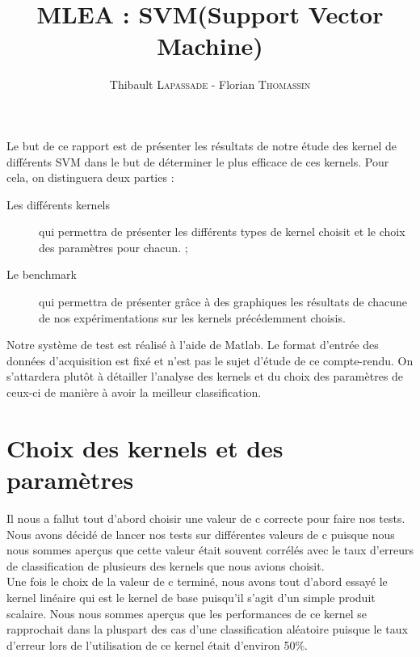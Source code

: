 \documentclass[fontsize=10pt, twoside=no]{scrartcl} %
\begin{document}
\title{MLEA : SVM(Support Vector Machine)}
\author{Thibault \textsc{Lapassade} - Florian \textsc{Thomassin}}
\date{}
\maketitle
\vspace*{-3cm}

\part{}

Le but de ce rapport est de présenter les résultats de notre étude des kernel de différents SVM dans le but de déterminer le plus efficace de ces kernels. Pour cela, on distinguera deux parties :

\begin{description}
\item[Les différents kernels] qui permettra de présenter les différents types de kernel choisit et le choix des paramètres pour chacun. ;
\item[Le benchmark] qui permettra de présenter grâce à des graphiques les résultats de chacune de nos expérimentations sur les kernels précédemment choisis.
\end{description}

Notre système de test est réalisé à l'aide de Matlab. Le format d'entrée des données d'acquisition est fixé et n'est pas le sujet d'étude de ce compte-rendu. On s'attardera plutôt à détailler l'analyse des kernels et du choix des paramètres de ceux-ci de manière à avoir la meilleur classification.

\part{Choix des kernels et des paramètres}

Il nous a fallut tout d'abord choisir une valeur de c correcte pour faire nos tests. Nous avons décidé de lancer nos tests sur différentes valeurs de c puisque nous nous sommes aperçus que cette valeur était souvent corrélés avec le taux d'erreurs de classification de plusieurs des kernels que nous avions choisit.\\

Une fois le choix de la valeur de c terminé, nous avons tout d'abord essayé le kernel linéaire qui est le kernel de base puisqu'il s'agit d'un simple produit scalaire. Nous nous sommes aperçus que les performances de ce kernel se rapprochait dans la pluspart des cas d'une classification aléatoire puisque le taux d'erreur lors de l'utilisation de ce kernel était d'environ 50{\%}.
\end{document}
